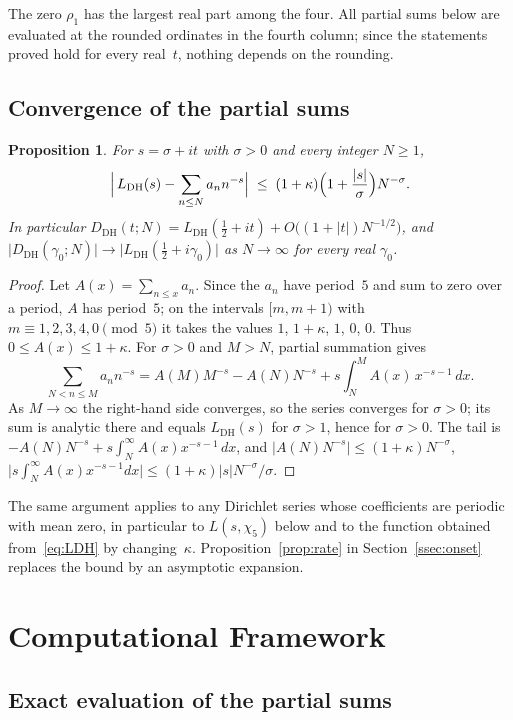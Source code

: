 \documentclass[11pt]{amsart}
\newtheorem{proposition}[theorem]{Proposition}
\theoremstyle{definition}
\theoremstyle{remark}
\renewcommand{\DH}{\mathrm{DH}}
\newcommand{\abs}[1]{\lvert #1 \rvert}
\begin{document}
The zero $\rho_1$ has the largest real part among the four.  All partial
sums below are evaluated at the rounded ordinates in the fourth column;
since the statements proved hold for every real~$t$, nothing depends on
the rounding.

\subsection{Convergence of the partial sums}\label{ssec:conv}

\begin{proposition}\label{prop:conv}
For $s=\sigma+it$ with $\sigma>0$ and every integer $N\ge1$,
\[
  \Bigl|\,L_{\DH}(s)-\sum_{n\le N}a_n n^{-s}\Bigr|
  \;\le\;(1+\kappa)\Bigl(1+\frac{\abs s}{\sigma}\Bigr)N^{-\sigma}.
\]
In particular
$D_{\DH}(t;N)=L_{\DH}(\tfrac12+it)+O\bigl((1+\abs t)N^{-1/2}\bigr)$, and
$\abs{D_{\DH}(\gamma_0;N)}\to\abs{L_{\DH}(\tfrac12+i\gamma_0)}$ as
$N\to\infty$ for every real $\gamma_0$.
\end{proposition}

\begin{proof}
Let $A(x)=\sum_{n\le x}a_n$.  Since the $a_n$ have period~$5$ and sum to
zero over a period, $A$ has period~$5$; on the intervals $[m,m+1)$ with
$m\equiv1,2,3,4,0\pmod5$ it takes the values $1$, $1+\kappa$, $1$, $0$,
$0$.  Thus $0\le A(x)\le1+\kappa$.  For $\sigma>0$ and $M>N$, partial
summation gives
\[
  \sum_{N<n\le M}a_nn^{-s}=A(M)M^{-s}-A(N)N^{-s}
  +s\int_N^{M}A(x)\,x^{-s-1}\,dx .
\]
As $M\to\infty$ the right-hand side converges, so the series converges for
$\sigma>0$; its sum is analytic there and equals $L_{\DH}(s)$ for
$\sigma>1$, hence for $\sigma>0$.  The tail is
$-A(N)N^{-s}+s\int_N^\infty A(x)x^{-s-1}\,dx$, and
$\abs{A(N)N^{-s}}\le(1+\kappa)N^{-\sigma}$,
$\abs{s\int_N^\infty A(x)x^{-s-1}dx}\le(1+\kappa)\abs sN^{-\sigma}/\sigma$.
\end{proof}

The same argument applies to any Dirichlet series whose coefficients are
periodic with mean zero, in particular to $L(s,\chi_5)$ below and to the
function obtained from~\eqref{eq:LDH} by changing~$\kappa$.
Proposition~\ref{prop:rate} in Section~\ref{ssec:onset} replaces the bound
by an asymptotic expansion.

\section{Computational Framework}\label{sec:framework}

\subsection{Exact evaluation of the partial sums}
\end{document}
